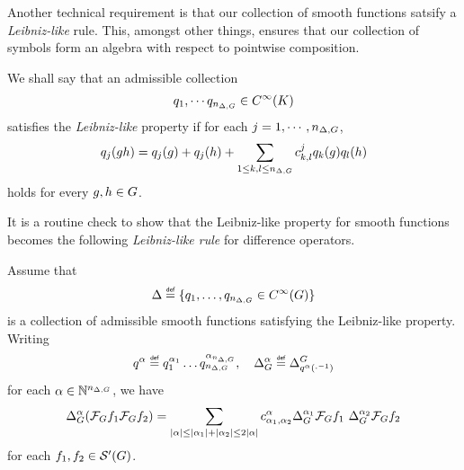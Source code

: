 Another technical requirement is that our collection of smooth functions satsify a \emph{Leibniz-like} rule.
This, amongst other things, ensures that our collection of symbols form an algebra with respect to pointwise composition.

\begin{definition}
\label{definition:Leibniz-like_property_for_smooth_functions}
    We shall say that an admissible collection
    \begin{align*}
        q_1, \cdots q_{n_{\Delta, G}} \in {C^\infty(K)}
    \end{align*}
    satisfies the \emph{Leibniz-like} property
    if for each $j = 1, \cdots, n_{\Delta, G}$,
    \begin{align*}
        q_j(g h) = q_j(g) + q_j(h) + \sum_{1 \leq k, l \leq n_{\Delta, G}} c^j_{k, l} q_k(g) q_l(h)
    \end{align*}
    holds for every $g, h \in G$.
\end{definition}

It is a routine check to show that the Leibniz-like property for smooth functions
becomes the following \emph{Leibniz-like rule} for difference operators.

\begin{lemma}
\label{lemma:Leibniz-like_property_for_difference_operators}
    Assume that
    \begin{align*}
        \Delta \defeq \{q_1, \dots, q_{\dimDifferenceOperators} \in \SmoothFunctions \Group\}
    \end{align*}
    is a collection of admissible smooth functions satisfying the Leibniz-like property.
    Writing
    \begin{align*}
        q^\alpha \defeq q^{\alpha_1}_1 \dots q^{\alpha_{\dimDifferenceOperators}}_{\dimDifferenceOperators},
        \quad \DifferenceOperatorOrder {\alpha} \defeq \DifferenceOperator {q^\alpha(\dummy^{-1})}
    \end{align*}
    for each $\alpha \in \mathbb{N}^{n_{\Delta, G}}$,
    we have
    \begin{align*}
        {\Delta_{G}^{\alpha}}
        (\mathcal{F}_{G} f_1 \mathcal{F}_{G} f_2)
        =
        \sum_{\left|{\alpha}\right| \leq \left|{\alpha_1}\right| + \left|{\alpha_2}\right| \leq 2 \left|{\alpha}\right|}
        c^{\alpha}_{\alpha_1, \alpha_2}
        {\Delta_{G}^{\alpha_1}} \mathcal{F}_{G} {f_1} \
        {\Delta_{G}^{\alpha_2}} \mathcal{F}_{G} {f_2}
    \end{align*}
    for each $f_1, f_2 \in {\mathcal{S}' (G)}$.
\end{lemma}

